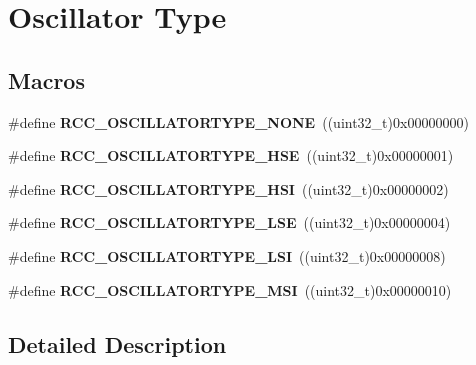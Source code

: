 \hypertarget{group___r_c_c___oscillator___type}{\section{Oscillator Type}
\label{group___r_c_c___oscillator___type}
}
\subsection*{Macros}
\begin{DoxyCompactItemize}
\item 
\hypertarget{group___r_c_c___oscillator___type_ga5a790362c5d7c4263f0f75a7367dd6b9}{\#define {\bfseries R\-C\-C\-\_\-\-O\-S\-C\-I\-L\-L\-A\-T\-O\-R\-T\-Y\-P\-E\-\_\-\-N\-O\-N\-E}~((uint32\-\_\-t)0x00000000)}\label{group___r_c_c___oscillator___type_ga5a790362c5d7c4263f0f75a7367dd6b9}

\item 
\hypertarget{group___r_c_c___oscillator___type_ga28cacd402dec84e548c9e4ba86d4603f}{\#define {\bfseries R\-C\-C\-\_\-\-O\-S\-C\-I\-L\-L\-A\-T\-O\-R\-T\-Y\-P\-E\-\_\-\-H\-S\-E}~((uint32\-\_\-t)0x00000001)}\label{group___r_c_c___oscillator___type_ga28cacd402dec84e548c9e4ba86d4603f}

\item 
\hypertarget{group___r_c_c___oscillator___type_gaa7ff7cbe9b0c2c511b0d0555e2a32a23}{\#define {\bfseries R\-C\-C\-\_\-\-O\-S\-C\-I\-L\-L\-A\-T\-O\-R\-T\-Y\-P\-E\-\_\-\-H\-S\-I}~((uint32\-\_\-t)0x00000002)}\label{group___r_c_c___oscillator___type_gaa7ff7cbe9b0c2c511b0d0555e2a32a23}

\item 
\hypertarget{group___r_c_c___oscillator___type_ga7036aec5659343c695d795e04d9152ba}{\#define {\bfseries R\-C\-C\-\_\-\-O\-S\-C\-I\-L\-L\-A\-T\-O\-R\-T\-Y\-P\-E\-\_\-\-L\-S\-E}~((uint32\-\_\-t)0x00000004)}\label{group___r_c_c___oscillator___type_ga7036aec5659343c695d795e04d9152ba}

\item 
\hypertarget{group___r_c_c___oscillator___type_ga3b7abb8ce0544cca0aa4550540194ce2}{\#define {\bfseries R\-C\-C\-\_\-\-O\-S\-C\-I\-L\-L\-A\-T\-O\-R\-T\-Y\-P\-E\-\_\-\-L\-S\-I}~((uint32\-\_\-t)0x00000008)}\label{group___r_c_c___oscillator___type_ga3b7abb8ce0544cca0aa4550540194ce2}

\item 
\hypertarget{group___r_c_c___oscillator___type_ga967ab49a19c9c88b4d7a85faf4707243}{\#define {\bfseries R\-C\-C\-\_\-\-O\-S\-C\-I\-L\-L\-A\-T\-O\-R\-T\-Y\-P\-E\-\_\-\-M\-S\-I}~((uint32\-\_\-t)0x00000010)}\label{group___r_c_c___oscillator___type_ga967ab49a19c9c88b4d7a85faf4707243}

\end{DoxyCompactItemize}


\subsection{Detailed Description}
